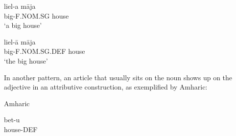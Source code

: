 
\item 


 \ea\label{}
\gll liel-a  m\=aja\\


big-F.NOM.SG  house\\

\glt ‘a big house’

\z

\item 


 \ea\label{}
\gll liel-\=a  m\=aja\\


big-F.NOM.SG.DEF  house\\

\glt ‘the big house’

\z

In another pattern, an article that usually sits on the noun shows up on the adjective in an attributive construction, as exemplified by Amharic:


\item 

Amharic 



\item 


 \ea\label{}
\gll bet-u\\


house-DEF\\


